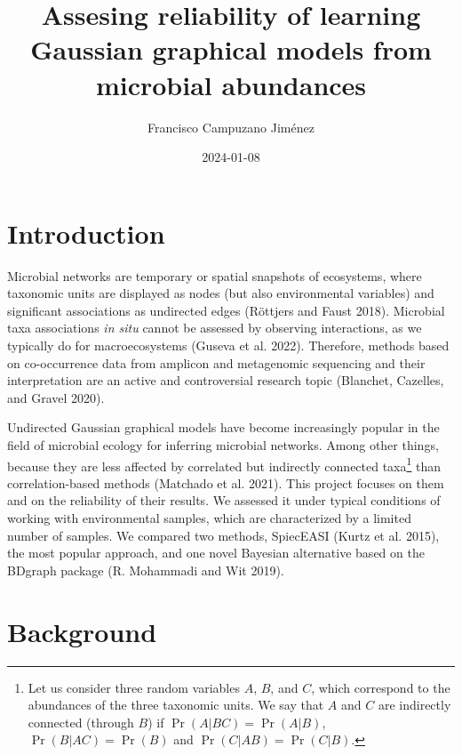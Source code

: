 \documentclass[
  a4paper,
]{article}
\title{Assesing reliability of learning Gaussian graphical models from
microbial abundances}
\author{Francisco Campuzano Jiménez}
\affil{%
                  Bioinformatics Research Centre, Aarhus University
              }
\date{2024-01-08}
\begin{document}
\maketitle
\newpage
\tableofcontents
\newpage\ifdefined\Shaded\renewenvironment{Shaded}{\begin{tcolorbox}[breakable, boxrule=0pt, frame hidden, interior hidden, sharp corners, borderline west={3pt}{0pt}{shadecolor}, enhanced]}{\end{tcolorbox}}\fi

\newpage
\linenumbers

\hypertarget{introduction}{%
\section{Introduction}\label{introduction}}

Microbial networks are temporary or spatial snapshots of ecosystems,
where taxonomic units are displayed as nodes (but also environmental
variables) and significant associations as undirected edges (Röttjers
and Faust 2018). Microbial taxa associations \emph{in situ} cannot be
assessed by observing interactions, as we typically do for
macroecosystems (Guseva et al. 2022). Therefore, methods based on
co-occurrence data from amplicon and metagenomic sequencing and their
interpretation are an active and controversial research topic (Blanchet,
Cazelles, and Gravel 2020).

Undirected Gaussian graphical models have become increasingly popular in
the field of microbial ecology for inferring microbial networks. Among
other things, because they are less affected by correlated but
indirectly connected taxa\footnote{Let us consider three random
  variables \(A\), \(B\), and \(C\), which correspond to the abundances
  of the three taxonomic units. We say that \(A\) and \(C\) are
  indirectly connected (through \(B\)) if \(\Pr(A |BC) = \Pr(A |B)\),
  \(\Pr(B |AC) = \Pr(B)\) and \(\Pr(C |AB) = \Pr(C |B)\).} than
correlation-based methods (Matchado et al. 2021). This project focuses
on them and on the reliability of their results. We assessed it under
typical conditions of working with environmental samples, which are
characterized by a limited number of samples. We compared two methods,
SpiecEASI (Kurtz et al. 2015), the most popular approach, and one novel
Bayesian alternative based on the BDgraph package (R. Mohammadi and Wit
2019).

\hypertarget{background}{%
\section{Background}\label{background}}
\end{document}
